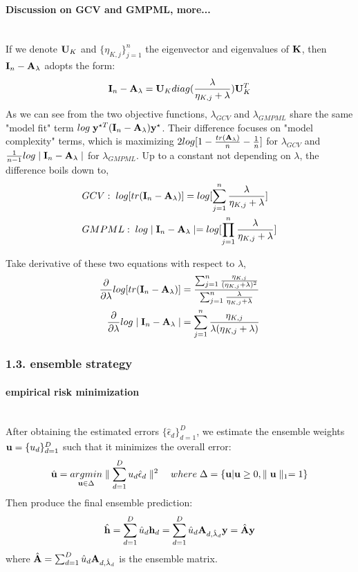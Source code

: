 \documentclass[11pt]{article}
\begin{document}
\vspace{2em}
\paragraph{Discussion on GCV and GMPML, more...}\mbox{}\\
If we denote ${\bf U}_K$ and $\{\eta_{K,j}\}_{j=1}^n$ the eigenvector and eigenvalues of ${\bf K}$, then ${\bf I}_n-{\bf A}_\lambda$ adopts the form:
\begin{align*}
{\bf I}_n-{\bf A}_\lambda={\bf U}_K diag(\frac{\lambda}{\eta_{K,j}+\lambda}){\bf U}_K^T
\end{align*}
As we can see from the two objective functions, $\lambda_{GCV}$ and $\lambda_{GMPML}$ share the same "model fit" term $log\; {\bf y}^{\star T}({\bf I}_n-{\bf A}_\lambda){\bf y}^\star$. Their difference focuses on "model complexity" terms, which is maximizing $2log[1-\frac{tr({\bf A}_\lambda)}{n}-\frac{1}{n}]$ for $\lambda_{GCV}$ and $\frac{1}{n-1}log \mid {\bf I}_n-{\bf A}_\lambda \mid$ for $\lambda_{GMPML}$. Up to a constant not depending on $\lambda$, the difference boils down to,
\begin{align}
&GCV: \; log[tr({\bf I}_n-{\bf A}_\lambda)]=log[\sum_{j=1}^n\frac{\lambda}{\eta_{K,j}+\lambda}]\\
&GMPML: \; log\mid {\bf I}_n-{\bf A}_\lambda\mid=log[\prod_{j=1}^n\frac{\lambda}{\eta_{K,j}+\lambda}]
\end{align}

Take derivative of these two equations with respect to $\lambda$,
\begin{align*}
\frac{\partial }{\partial \lambda}log[tr({\bf I}_n-{\bf A}_\lambda)]&=\frac{\sum_{j=1}^n\frac{\eta_{K,j}}{(\eta_{K,j}+\lambda)^2}}{\sum_{j=1}^n\frac{\lambda}{\eta_{K,j}+\lambda}}\\
\frac{\partial }{\partial \lambda}log\mid {\bf I}_n-{\bf A}_\lambda\mid&=\sum_{j=1}^n\frac{\eta_{K,j}}{\lambda(\eta_{K,j}+\lambda)}
\end{align*}


\subsubsection*{{1.3. ensemble strategy}}

\paragraph{empirical risk minimization}\mbox{}\\
After obtaining the estimated errors $\{\hat{\epsilon}_d\}_{d=1}^D$, we estimate the ensemble weights ${\bf u}=\{u_d\}_{d=1}^D$ such that it minimizes the overall error:
\begin{align*}
\hat{{\bf u}}=\underset{{\bf u} \in \Delta}{argmin}\parallel \sum_{d=1}^Du_d\hat{\epsilon}_d\parallel^2 \quad where\; \Delta=\{{\bf u} | {\bf u} \geq 0, \parallel {\bf u} \parallel_1=1\}
\end{align*}
Then produce the final ensemble prediction:
\begin{align*}
\hat{{\bf h}}=\sum_{d=1}^D \hat{u}_d {\bf h}_d=\sum_{d=1}^D \hat{u}_d {\bf A}_{d,\hat{\lambda}_d}{\bf y}=\hat{{\bf A}}{\bf y}
\end{align*}
where $\hat{{\bf A}}=\sum_{d=1}^D \hat{u}_d {\bf A}_{d,\hat{\lambda}_d}$ is the ensemble matrix.
\end{document}

